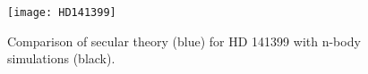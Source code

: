 \documentclass[11pt, oneside]{article}   	%
\begin{document}
\begin{figure}[!h]
\begin{center}
\texttt{[image: HD141399]}
\caption[]{Comparison of secular theory (blue) for HD 141399 with n-body simulations (black).}
\label{}
\end{center}
\end{figure}

\newpage
\
 
\newpage

\titleformat{\section}{\normalfont\large\bfseries}{\thesection}{1em}{}
\let\oldaddcontentsline\addcontentsline%
\renewcommand{\addcontentsline}[3]{}%

 


\let\addcontentsline\oldaddcontentsline%
\end{document}
